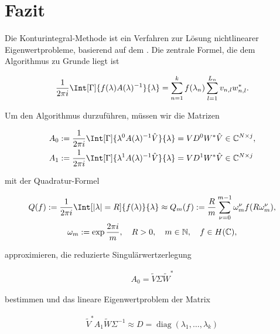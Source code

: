 \section{Fazit}

Die Konturintegral-Methode ist ein Verfahren zur Lösung nichtlinearer Eigenwertprobleme, basierend auf dem .
Die zentrale Formel, die dem Algorithmus zu Grunde liegt ist

\begin{gather*}
    \frac{1}{2 \pi i}
    \Int[\Gamma]{f(\lambda) A(\lambda)^{-1}}{\lambda}
    =
    \sum_{n=1}^k
        f(\lambda_n)
        \sum_{l=1}^{L_n}
            v_{n, l} w_{n, l}^\ast.
\end{gather*}

Um den Algorithmus durzuführen, müssen wir die Matrizen

\begin{align*}
    A_0
    & :=
    \frac{1}{2 \pi i}
    \Int[\Gamma]{\lambda^0 A(\lambda)^{-1} \hat V}{\lambda}
    =
    V D^0 W^\ast \hat V
    \in
    \C^{N \times j}, \\
    A_1
    & :=
    \frac{1}{2 \pi i}
    \Int[\Gamma]{\lambda^1 A(\lambda)^{-1} \hat V}{\lambda}
    =
    V D^1 W^\ast \hat V
    \in
    \C^{N \times j}
\end{align*}

mit der Quadratur-Formel

\begin{gather*}
    Q(f)
    :=
    \frac{1}{2 \pi i}
    \Int[|\lambda| = R]{f(\lambda)}{\lambda}
    \approx
    Q_m(f)
    :=
    \frac{R}{m}
    \sum_{\nu = 0}^{m-1}
        \omega_m^\nu f(R \omega_m^\nu), \\
    \omega_m
    :=
    \exp \frac{2 \pi i}{m},
    \quad
    R > 0,
    \quad
    m \in \N,
    \quad
    f \in H(\C),
\end{gather*}

approximieren, die reduzierte Singulärwertzerlegung

\begin{align*}
    A_0
    =
    \tilde V \Sigma \tilde W^\ast
\end{align*}

bestimmen und das lineare Eigenwertproblem der Matrix

\begin{align*}
    \tilde V^\ast A_1 \tilde W \Sigma^{-1}
    \approx
    D
    =
    \operatorname{diag}(\lambda_1, \dots, \lambda_k)
\end{align*}

